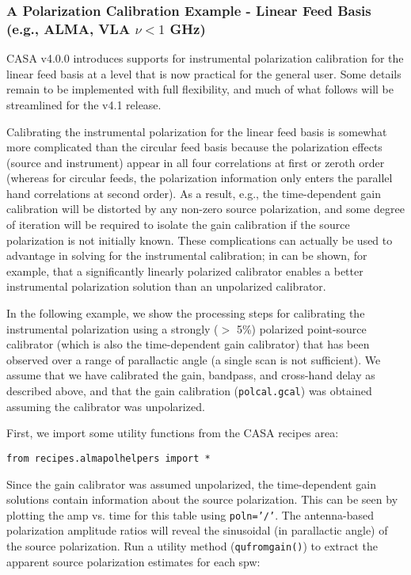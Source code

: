 \subsubsection{A Polarization Calibration Example - Linear Feed
  Basis (e.g., ALMA, VLA $\nu<1$ GHz)}
\label{section:cal.solve.pol.example2}

CASA v4.0.0 introduces supports for instrumental polarization 
calibration for the linear feed basis at a level that is now
practical for the general user.  Some details remain to be
implemented with full flexibility, and much of what follows
will be streamlined for the v4.1 release.

Calibrating the instrumental polarization for the linear feed basis
is somewhat more complicated than the circular feed basis because
the polarization effects (source and instrument) appear in all
four correlations at first or zeroth order (whereas for circular
feeds, the polarization information only enters the parallel
hand correlations at second order).   As a result, e.g., the 
time-dependent gain calibration will be distorted by any non-zero 
source polarization, and some degree of iteration will be required to
isolate the gain calibration if the source polarization is not
initially known.  These complications can actually be used to 
advantage in solving for the instrumental calibration; in can
be shown, for example, that a significantly linearly polarized
calibrator enables a better instrumental polarization 
solution than an unpolarized calibrator.

In the following example, we show the processing steps for calibrating
the instrumental polarization using a strongly ($>$ 5\%) polarized
point-source calibrator (which is also the time-dependent gain
calibrator) that has been observed over a range of parallactic angle
(a single scan is not sufficient).  We assume that we have calibrated
the gain, bandpass, and cross-hand delay as described above, and that
the gain calibration ({\tt polcal.gcal}) was obtained assuming the
calibrator was unpolarized.

First, we import some utility functions from the CASA recipes
area:

\small
\begin{verbatim}
from recipes.almapolhelpers import *
\end{verbatim}

\normalsize 

Since the gain calibrator was assumed unpolarized, the time-dependent
gain solutions contain information about the source polarization.
This can be seen by plotting the amp vs. time for this table using
{\tt poln='/'}.  The antenna-based polarization amplitude ratios will
reveal the sinusoidal (in parallactic angle) of the source
polarization.  Run a utility method ({\tt qufromgain()}) to extract
the apparent source polarization estimates for each spw:


